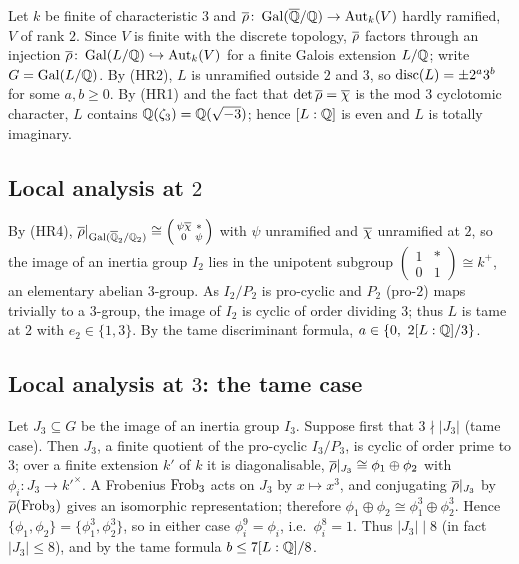 \documentclass[11pt]{article}
\begin{document}
Let $k$ be finite of characteristic $3$ and $\overline{\rho}\colon\operatorname{Gal}(\overline{\mathbb{Q}}/\mathbb{Q})\to\operatorname{Aut}_k(V)$
hardly ramified, $V$ of rank $2$. Since $V$ is finite with the discrete
topology, $\overline{\rho}$ factors through an injection
$\overline{\rho}\colon\operatorname{Gal}(L/\mathbb{Q})\hookrightarrow\operatorname{Aut}_k(V)$ for a finite Galois extension
$L/\mathbb{Q}$; write $G=\operatorname{Gal}(L/\mathbb{Q})$. By (HR2), $L$ is unramified outside $2$ and $3$,
so $\operatorname{disc}(L)=\pm2^{a}3^{b}$ for some $a,b\geq0$. By (HR1) and the fact that
$\det\overline{\rho}=\overline{\chi}$ is the mod $3$ cyclotomic character, $L$ contains
$\mathbb{Q}(\zeta_3)=\mathbb{Q}(\sqrt{-3})$; hence $[L:\mathbb{Q}]$ is even and $L$ is totally
imaginary.

\subsection*{Local analysis at $2$}
By (HR4), $\overline{\rho}|_{\operatorname{Gal}(\overline{\mathbb{Q}}_2/\mathbb{Q}_2)}\cong\left(\begin{smallmatrix}\psi\overline{\chi}&*\\0&\psi\end{smallmatrix}\right)$
with $\psi$ unramified and $\overline{\chi}$ unramified at $2$, so the image of an
inertia group $I_2$ lies in the unipotent subgroup $\left(\begin{smallmatrix}1&*\\0&1\end{smallmatrix}\right)\cong k^{+}$,
an elementary abelian $3$-group. As $I_2/P_2$ is pro-cyclic and $P_2$ (pro-$2$)
maps trivially to a $3$-group, the image of $I_2$ is cyclic of order dividing
$3$; thus $L$ is tame at $2$ with $e_2\in\{1,3\}$. By the tame discriminant
formula, $a\in\{0,\ 2[L:\Q]/3\}$.

\subsection*{Local analysis at $3$: the tame case}
Let $J_3\subseteq G$ be the image of an inertia group $I_3$. Suppose first that
$3\nmid|J_3|$ (tame case). Then $J_3$, a finite quotient of the pro-cyclic
$I_3/P_3$, is cyclic of order prime to $3$; over a finite extension $k'$ of $k$
it is diagonalisable, $\overline{\rho}|_{J_3}\cong\phi_1\oplus\phi_2$ with
$\phi_i\colon J_3\to k'^\times$. A Frobenius $\operatorname{Frob}_3$ acts on $J_3$ by
$x\mapsto x^3$, and conjugating $\overline{\rho}|_{J_3}$ by $\overline{\rho}(\operatorname{Frob}_3)$ gives an
isomorphic representation; therefore
$\phi_1\oplus\phi_2\cong\phi_1^{3}\oplus\phi_2^{3}$. Hence
$\{\phi_1,\phi_2\}=\{\phi_1^3,\phi_2^3\}$, so in either case $\phi_i^9=\phi_i$,
i.e.\ $\phi_i^{8}=1$. Thus $|J_3|\mid 8$ (in fact $|J_3|\leq 8$), and by the
tame formula $b\leq 7[L:\mathbb{Q}]/8$.
\end{document}
